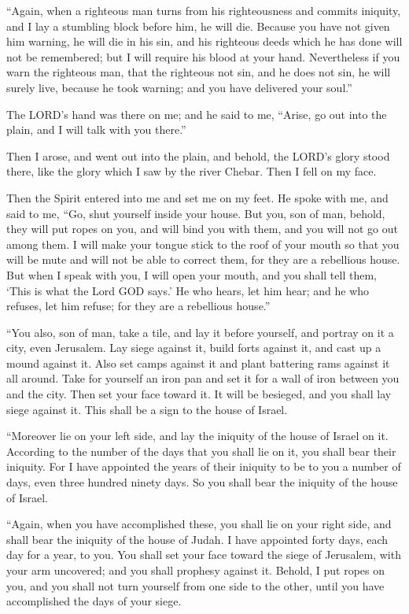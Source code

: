 \myverse{}“Again, when a righteous man turns from his righteousness and
commits iniquity, and I lay a stumbling block before him, he will die. Because you have not given him
warning, he will die in his sin, and his righteous deeds which he has done will not be remembered; but
I will require his blood at your hand.
\myverse{}Nevertheless if you warn the righteous man, that the righteous not sin, and
he does not sin, he will surely live, because he took warning; and you have delivered your soul.”

\myverse{}The LORD’s hand was there on me; and he said to me, “Arise, go
out into the plain, and I will talk with you there.”

\myverse{}Then I arose, and went out into the plain, and behold, the LORD’s
glory stood there, like the glory which I saw by the river Chebar. Then I fell on my face.

\myverse{}Then the Spirit entered into me and set me on my feet. He spoke
with me, and said to me, “Go, shut yourself inside your house.
\myverse{}But you, son of man, behold, they will put ropes on you, and will bind you
with them, and you will not go out among them.
\myverse{}I will make your tongue stick to the roof of your mouth so that you will be
mute and will not be able to correct them, for they are a rebellious house.
\myverse{}But when I speak with you, I will open your mouth, and you shall tell them,
‘This is what the Lord GOD says.’ He who hears, let him hear; and he who refuses, let him refuse; for
they are a rebellious house.”


\mychapter{} \myverse*{}“You also, son of man, take a tile, and lay it before yourself,
and portray on it a city, even Jerusalem.
\myverse{}Lay siege against it, build forts against it, and cast up a mound against it.
Also set camps against it and plant battering rams against it all around.
\myverse{}Take for yourself an iron pan and set it for a wall of iron between you and
the city. Then set your face toward it. It will be besieged, and you shall lay siege against it. This
shall be a sign to the house of Israel.

\myverse{}“Moreover lie on your left side, and lay the iniquity of the house
of Israel on it. According to the number of the days that you shall lie on it, you shall bear their iniquity.
\myverse{}For I have appointed the years of their iniquity to be to you a number of days,
even three hundred ninety days. So you shall bear the iniquity of the house of Israel.

\myverse{}“Again, when you have accomplished these, you shall lie on your
right side, and shall bear the iniquity of the house of Judah. I have appointed forty days, each day for
a year, to you.
\myverse{}You shall set your face toward the siege of Jerusalem, with your arm uncovered;
and you shall prophesy against it.
\myverse{}Behold, I put ropes on you, and you shall not turn yourself from one side to
the other, until you have accomplished the days of your siege.


